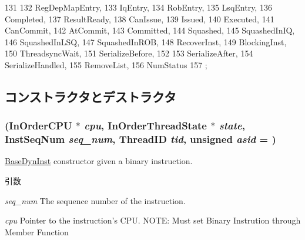 \begin{DoxyCode}
131                 {
132         RegDepMapEntry,          
133         IqEntry,                 
134         RobEntry,                
135         LsqEntry,                
136         Completed,               
137         ResultReady,             
138         CanIssue,                
139         Issued,                  
140         Executed,                
141         CanCommit,               
142         AtCommit,                
143         Committed,               
144         Squashed,                
145         SquashedInIQ,            
146         SquashedInLSQ,           
147         SquashedInROB,           
148         RecoverInst,             
149         BlockingInst,            
150         ThreadsyncWait,          
151         SerializeBefore,         
152 
153         SerializeAfter,          
154         SerializeHandled,        
155         RemoveList,               
156         NumStatus
157     };
\end{DoxyCode}


\subsection{コンストラクタとデストラクタ}
\hypertarget{classInOrderDynInst_ab2dc23a7d8b60619acd58194f72f053a}{
\subsubsection[{InOrderDynInst}]{ ({\bf InOrderCPU} $\ast$ {\em cpu}, \/  {\bf InOrderThreadState} $\ast$ {\em state}, \/  {\bf InstSeqNum} {\em seq\_\-num}, \/  {\bf ThreadID} {\em tid}, \/  unsigned {\em asid} = {})}}
\label{classInOrderDynInst_ab2dc23a7d8b60619acd58194f72f053a}
\hyperlink{classBaseDynInst}{BaseDynInst} constructor given a binary instruction. 
\begin{DoxyParams}{引数}
\item[{\em seq\_\-num}]The sequence number of the instruction. \item[{\em cpu}]Pointer to the instruction's CPU. NOTE: Must set Binary Instrution through Member Function \end{DoxyParams}



